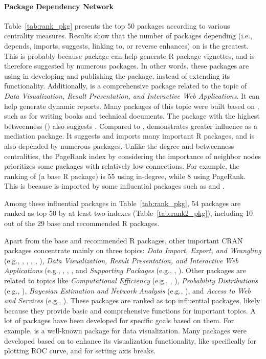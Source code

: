 \paragraph{Package Dependency Network} Table~\ref{tab:rank_pkg} presents the top 50 packages according to various centrality measures. Results show that the number of packages depending (i.e., depends, imports, suggests, linking to, or reverse enhances) on  is the greatest. This is probably because  package can help generate R package vignettes, and is therefore suggested by numerous packages. In other words, these packages are using  in developing and publishing the package, instead of extending its functionality. Additionally,  is a comprehensive package related to the topic of {\it Data Visualization, Result Presentation, and Interactive Web Applications}.  It can help generate dynamic reports. Many packages of this topic were built based on , such as  for writing books and technical documents. The package with the highest betweenness () also suggests . Compared to ,  demonstrates greater influence as a mediation package. It suggests and imports many important R packages, and is also depended by numerous packages. Unlike the degree and betweenness centralities, the PageRank index by considering the importance of neighbor nodes prioritizes some packages with relatively low connections. For example, the ranking of  (a base R package) is 55 using in-degree, while 8 using PageRank. This is because  is imported by some influential packages such as  and . 


Among these influential packages in Table~\ref{tab:rank_pkg}, 54 packages are ranked as top 50 by at least two indexes (Table~\ref{tab:rank2_pkg}), including 10 out of the 29 base and recommended R packages. 


Apart from the base and recommended R packages, other important CRAN packages concentrate mainly on three topics: {\it Data Import, Export, and Wrangling} (e.g., , , , , ), {\it Data Visualization, Result Presentation, and Interactive Web Applications} (e.g., , , , and  {\it Supporting Packages} (e.g., , ). Other packages are related to topics like {\it Computational Efficiency} (e.g., , ), {\it Probability Distributions} (e.g., ), {\it Bayesian Estimation and Network Analysis} (e.g., ), and {\it Access to Web and Services} (e.g., ). These packages are ranked as top influential packages, likely because they provide basic and comprehensive functions for important topics. A lot of packages have been developed for specific goals based on them.  For example,  is a well-known package for data visualization. Many packages were developed based on  to enhance its visualization functionality, like  specifically for plotting ROC curve, and  for setting axis breaks.

